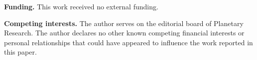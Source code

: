 \documentclass[article,review]{planetary}
\begin{document}
\noindent\textbf{Funding.} This work received no external funding.

\noindent\textbf{Competing interests.} The author serves on the editorial board of Planetary Research. The author declares no other known competing financial interests or personal relationships that could have appeared to influence the work reported in this paper.

\printbibliography
\end{document}

